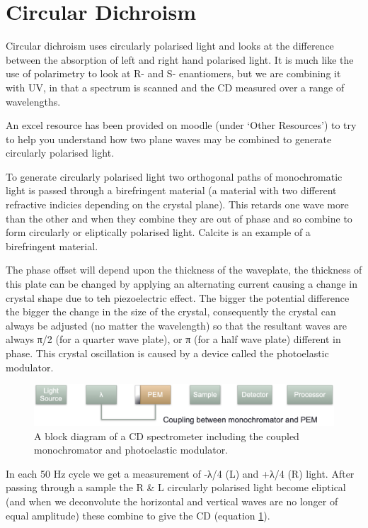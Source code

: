 \documentclass[
]{book}
\begin{document}
\hypertarget{circular-dichroism}{%
\section{Circular Dichroism}\label{circular-dichroism}}

Circular dichroism uses circularly polarised light and looks at the difference between the absorption of left and right hand polarised light. It is much like the use of polarimetry to look at R- and S- enantiomers, but we are combining it with UV, in that a spectrum is scanned and the CD measured over a range of wavelengths.

An excel resource has been provided on moodle (under `Other Resources') to try to help you understand how two plane waves may be combined to generate circularly polarised light.

To generate circularly polarised light two orthogonal paths of monochromatic light is passed through a birefringent material (a material with two different refractive indicies depending on the crystal plane). This retards one wave more than the other and when they combine they are out of phase and so combine to form circularly or eliptically polarised light. Calcite is an example of a birefringent material.

The phase offset will depend upon the thickness of the waveplate, the thickness of this plate can be changed by applying an alternating current causing a change in crystal shape due to teh piezoelectric effect. The bigger the potential difference the bigger the change in the size of the crystal, consequently the crystal can always be adjusted (no matter the wavelength) so that the resultant waves are always π/2 (for a quarter wave plate), or π (for a half wave plate) different in phase. This crystal oscillation is caused by a device called the photoelastic modulator.

\begin{figure}

{\centering \includegraphics[width=0.6\linewidth]{images/CD} 

}

\caption{A block diagram of a CD spectrometer including the coupled monochromator and photoelastic modulator.}\label{fig:CD}
\end{figure}

In each 50 Hz cycle we get a measurement of -λ/4 (L) and +λ/4 (R) light. After passing through a sample the R \& L circularly polarised light become eliptical (and when we deconvolute the horizontal and vertical waves are no longer of equal amplitude) these combine to give the CD (equation \ref{fig:CD}).
\end{document}
